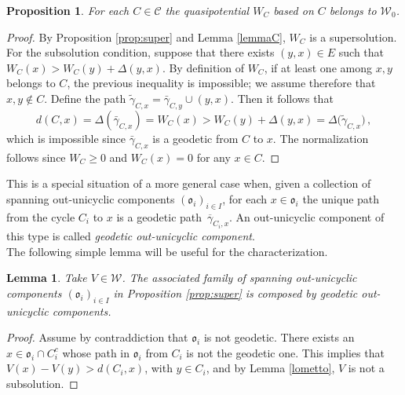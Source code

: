 \documentclass[reqno]{amsart}
\theoremstyle{plain}
\newtheorem{proposition}[theorem]{Proposition}
\newtheorem{lemma}[theorem]{Lemma}
\theoremstyle{definition}
\theoremstyle{remark}
\numberwithin{equation}{section}
\numberwithin{theorem}{section}
\newcommand{\upbar}[1]{\,\overline{\! #1}}
\newcommand{\<}{\langle}
\renewcommand{\>}{\rangle}
\begin{document}
\begin{proposition}
	For each $C\in\mathcal{C}$ the \emph{quasipotential} $W_{C}$ based on $C$ belongs to $\mathcal{W}_0$.
\end{proposition}

\begin{proof}
	By Proposition \ref{prop:super} and Lemma \ref{lemmaC}, $W_C$ is a supersolution.
	For the subsolution condition, suppose that there exists $(y,x)\in E$ such that $W_{C}(x)>W_{C}(y)+ \Delta(y,x)$. By definition of $W_C$, if at least one among $x,y$ belongs to $C$, the previous inequality is impossible; we assume therefore that $x,y\not\in C$. Define the path $\tilde{\gamma}_{C,x}=\bar{\gamma}_{C,y}\cup(y,x)$. Then it follows that \[d(C,x)=\Delta(\bar{\gamma}_{C,x})=W_C(x)>W_{C}(y)+ \Delta(y,x)=\Delta\big(\tilde{\gamma}_{C,x}\big)\,,\] 
	which is impossible since $\bar{\gamma}_{C,x}$ is a geodetic from $C$ to $x$. The normalization follows since $W_C\geq 0$ and $W_C(x)=0$ for any $x\in C$.
\end{proof}



This is a special situation of a more general case when, given a collection of spanning out-unicyclic components $(\mathfrak o_i)_{i\in I}$, for each $x\in \mathfrak o_i$ the unique path from  the cycle $C_i$ to $x$ is a geodetic path $\upbar \gamma_{C_i,x}$. An out-unicyclic component of this type is called \emph{geodetic out-unicyclic component}.\\

The following simple lemma will be useful for the characterization.
\begin{lemma}
	Take $V\in\mathcal{W}$. The associated family of spanning out-unicyclic components $(\mathfrak o_i)_{i\in I}$ in Proposition \ref{prop:super} is composed by geodetic out-unicyclic components.
\end{lemma}
\begin{proof}
	Assume by contraddiction that $\mathfrak o_i$ is not geodetic. There exists an $x\in \mathfrak o_i\cap C_i^c$ whose path in $\mathfrak o_i$ from $C_i$ is not the geodetic one. This implies that $V(x)-V(y)>d(C_i,x)$, with $y\in C_i$, and by Lemma \ref{lometto}, $V$ is not a subsolution.
\end{proof}
\end{document}
